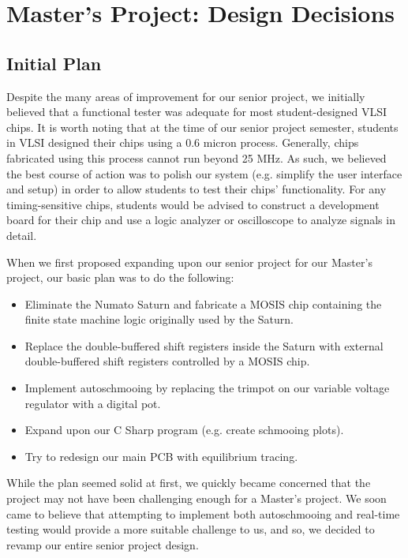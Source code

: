 \section{Master's Project: Design Decisions}

\subsection{Initial Plan}
Despite the many areas of improvement for our senior project, we initially believed that a functional tester was adequate for most student-designed VLSI chips. It is worth noting that at the time of our senior project semester, students in VLSI designed their chips using a 0.6 micron process. Generally, chips fabricated using this process cannot run beyond 25 MHz. As such, we believed the best course of action was to polish our system (e.g. simplify the user interface and setup) in order to allow students to test their chips' functionality. For any timing-sensitive chips, students would be advised to construct a development board for their chip and use a logic analyzer or oscilloscope to analyze signals in detail.

When we first proposed expanding upon our senior project for our Master's project, our basic plan was to do the following: 
\begin{itemize}
\item Eliminate the Numato Saturn and fabricate a MOSIS chip containing the finite state machine logic originally used by the Saturn.
\item Replace the double-buffered shift registers inside the Saturn with external double-buffered shift registers controlled by a MOSIS chip.
\item Implement autoschmooing by replacing the trimpot on our variable voltage regulator with a digital pot.
\item Expand upon our C Sharp program (e.g. create schmooing plots).
\item Try to redesign our main PCB with equilibrium tracing.
\end{itemize}

While the plan seemed solid at first, we quickly became concerned that the project may not have been challenging enough for a Master's project. We soon came to believe that attempting to implement both autoschmooing and real-time testing would provide a more suitable challenge to us, and so, we decided to revamp our entire senior project design.

